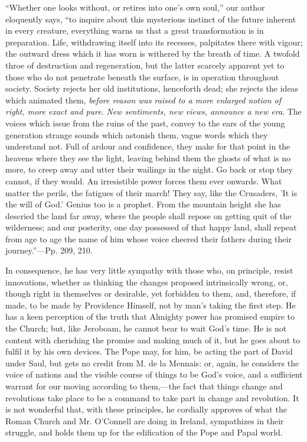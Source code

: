 ``Whether
one looks without, or retires into one's own soul,'' our author
eloquently says, ``to inquire about this mysterious instinct of the
future inherent in every creature, everything warns us that a great
transformation is in preparation. Life, withdrawing itself into its
recesses, palpitates there with vigour; the outward dress which it has
worn is withered by the breath of time. A twofold throe of destruction
and regeneration, but the latter scarcely apparent yet to those who do
not penetrate beneath the surface, is in operation throughout society.
Society rejects her old institutions, henceforth dead; she rejects the
ideas which animated them, \emph{before reason was raised to a more
enlarged notion of right, more exact and pure}. \emph{New sentiments,
new views, announce a new era}. The voices which issue from the
ruins of the past, convey to the ears of the young generation strange
sounds which astonish them, vague words which they understand not.
Full of ardour and confidence, they make for that point in the heavens
where they see the light, leaving behind them the ghosts of what is no
more, to creep away and utter their wailings in the night. Go back or
stop they cannot, if they would. An irresistible power forces them
ever onwards. What matter the perils, the fatigues of their march!
They say, like the Crusaders, 'It is the will of God.' Genius too is a
prophet. From the mountain height she has descried the land far away,
where the people shall repose on getting quit of the wilderness; and
our posterity, one day possessed of that happy land, shall repeat from
age to age the name of him whose voice cheered their fathers during
their journey.''—Pp. 209, 210.

In consequence, he has very little sympathy with
those who, on principle, resist innovations, whether as thinking the
changes proposed intrinsically wrong, or, though right in themselves
or desirable, yet forbidden to them, and, therefore, if made, to
be made by Providence Himself, not by man's taking the first step. He
has a keen perception of the truth that Almighty power has promised
empire to the Church; but, like Jeroboam, he cannot bear to wait God's
time. He is not content with cherishing the promise and making much of
it, but he goes about to fulfil it by his own devices. The Pope may,
for him, be acting the part of David under Saul, but gets no credit
from M. de la Mennais: or, again, he considers the voice of nations
and the visible course of things to be God's voice, and a sufficient
warrant for our moving according to them,—the fact that things
change and revolutions take place to be a command to take part in
change and revolution. It is not wonderful that, with these
principles, he cordially approves of what the Roman Church and Mr. O'Connell
are doing in Ireland, sympathizes in their struggle, and holds them up
for the edification of the Pope and Papal world.

